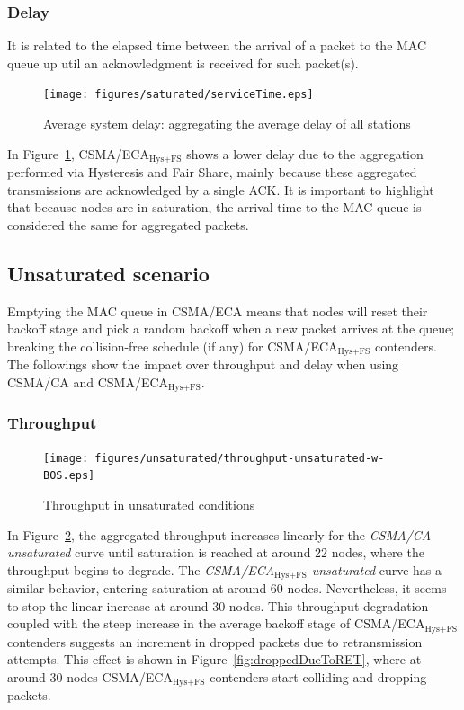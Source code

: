 \documentclass[a4paper,journal]{IEEEtran}
\begin{document}
	\subsubsection{Delay}
	
	It is related to the elapsed time between the arrival of a packet to the MAC queue up util an acknowledgment is received for such packet(s).

	\begin{figure}[htbp]
		\centering
		\texttt{[image: figures/saturated/serviceTime.eps]}
		\caption{Average system delay: aggregating the average delay of all stations}
		\label{fig:serviceTime-sat}
	\end{figure}
	
	In Figure~\ref{fig:serviceTime-sat}, CSMA/ECA$_{\text{Hys+FS}}$ shows a lower delay due to the aggregation performed via Hysteresis and Fair Share, mainly because these aggregated transmissions are acknowledged by a single ACK. It is important to highlight that because nodes are in saturation, the arrival time to the MAC queue is considered the same for aggregated packets.

	\subsection{Unsaturated scenario}\label{resultsUnsaturated}
	Emptying the MAC queue in CSMA/ECA means that nodes will reset their backoff stage and pick a random backoff when a new packet arrives at the queue; breaking the collision-free schedule (if any)  for CSMA/ECA$_{\text{Hys+FS}}$ contenders. The followings show the impact over throughput and delay when using CSMA/CA and CSMA/ECA$_{\text{Hys+FS}}$.\\
	
	\subsubsection{Throughput}
	
   	\begin{figure}[htbp]
		\centering
		\texttt{[image: figures/unsaturated/throughput-unsaturated-w-BOS.eps]}
		\caption{Throughput in unsaturated conditions}
		\label{fig:throughputUnsat}
	\end{figure}
	
	In Figure~\ref{fig:throughputUnsat}, the aggregated throughput increases linearly for the \emph{CSMA/CA unsaturated} curve until saturation is reached at around 22 nodes, where the throughput begins to degrade. The \emph{CSMA/ECA$_{\text{Hys+FS}}$ unsaturated} curve has a similar behavior, entering saturation at around 60 nodes. Nevertheless, it seems to stop the linear increase at around 30 nodes. This throughput degradation coupled with the steep increase in the average backoff stage of CSMA/ECA$_{\text{Hys+FS}}$ contenders suggests an increment in dropped packets due to retransmission attempts. This effect is shown in Figure~\ref{fig:droppedDueToRET}, where at around 30 nodes CSMA/ECA$_{\text{Hys+FS}}$ contenders start colliding and dropping packets. 
	
\end{document}
